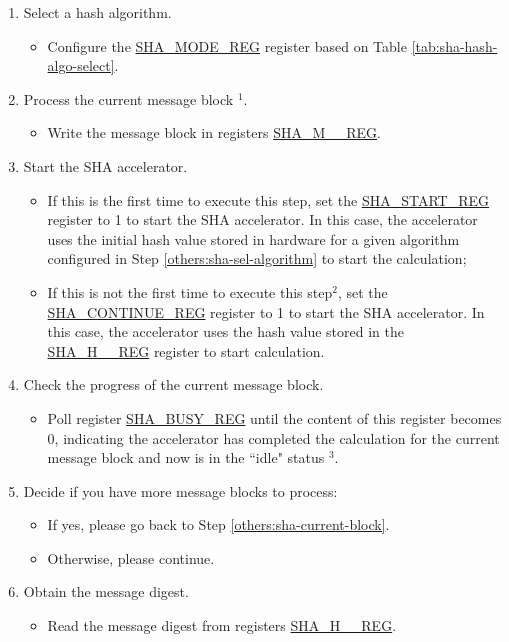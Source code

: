 \documentclass[main\_\_EN.tex]{subfiles}
\begin{document}
\begin{enumerate}
    \item \label{others:sha-sel-algorithm} Select a hash algorithm.
    \begin{itemize}
        \item Configure the \hyperref[regdesc:SHAMODEREG]{SHA\_MODE\_REG} register based on Table \ref{tab:sha-hash-algo-select}.
    \end{itemize}
    \item \label{others:sha-current-block} Process the current message block \hyperref[others:sha-note-typical-sha]{$^1$}.
    \begin{itemize}
        \item Write the message block in registers \hyperref[regdesc:SHAMNREG]{SHA\_M\_\_REG}.
    \end{itemize}
    \item Start the SHA accelerator.
    \begin{itemize}
        \item If this is the first time to execute this step, set the \hyperref[regdesc:SHASTARTREG]{SHA\_START\_REG} register to 1 to start the SHA accelerator. In this case, the accelerator uses the initial hash value stored in hardware for a given algorithm configured in Step \ref{others:sha-sel-algorithm} to start the calculation;
        \item If this is not the first time to execute this step\hyperref[others:sha-note-typical-sha]{$^2$}, set the \hyperref[regdesc:SHACONTINUEREG]{SHA\_CONTINUE\_REG} register to 1 to start the SHA accelerator. In this case, the accelerator uses the hash value stored in the \hyperref[regdesc:SHAHNREG]{SHA\_H\_\_REG} register to start calculation.
    \end{itemize}
    \item Check the progress of the current message block.
    \begin{itemize}
        \item Poll register \hyperref[regdesc:SHABUSYREG]{SHA\_BUSY\_REG} until the content of this register becomes 0, indicating the accelerator has completed the calculation for the current message block and now is in the ``idle" status \hyperref[others:sha-note-typical-sha]{$^3$}. 
    \end{itemize}
        
    \item Decide if you have more message blocks to process:
    \begin{itemize}
        \item If yes, please go back to Step \ref{others:sha-current-block}.
        \item Otherwise, please continue.
    \end{itemize}

    \item Obtain the message digest.
    \begin{itemize}
        \item Read the message digest from registers \hyperref[regdesc:SHAHNREG]{SHA\_H\_\_REG}.
    \end{itemize}
\end{enumerate}
  
\end{document}
